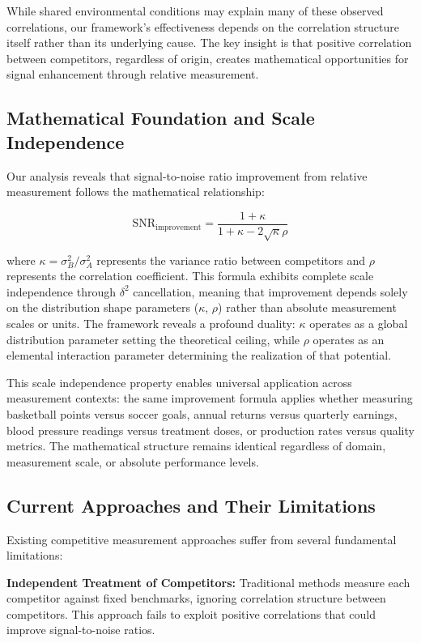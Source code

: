 While shared environmental conditions may explain many of these observed correlations, our framework's effectiveness depends on the correlation structure itself rather than its underlying cause. The key insight is that positive correlation between competitors, regardless of origin, creates mathematical opportunities for signal enhancement through relative measurement.

\subsection{Mathematical Foundation and Scale Independence}

Our analysis reveals that signal-to-noise ratio improvement from relative measurement follows the mathematical relationship:

$$\text{SNR}_{\text{improvement}} = \frac{1 + \kappa}{1 + \kappa - 2\sqrt{\kappa}\rho}$$

where $\kappa = \sigma^2_B/\sigma^2_A$ represents the variance ratio between competitors and $\rho$ represents the correlation coefficient. This formula exhibits complete scale independence through $\delta^2$ cancellation, meaning that improvement depends solely on the distribution shape parameters ($\kappa$, $\rho$) rather than absolute measurement scales or units. The framework reveals a profound duality: $\kappa$ operates as a global distribution parameter setting the theoretical ceiling, while $\rho$ operates as an elemental interaction parameter determining the realization of that potential.

This scale independence property enables universal application across measurement contexts: the same improvement formula applies whether measuring basketball points versus soccer goals, annual returns versus quarterly earnings, blood pressure readings versus treatment doses, or production rates versus quality metrics. The mathematical structure remains identical regardless of domain, measurement scale, or absolute performance levels.

\subsection{Current Approaches and Their Limitations}

Existing competitive measurement approaches suffer from several fundamental limitations:

\textbf{Independent Treatment of Competitors:}
Traditional methods measure each competitor against fixed benchmarks, ignoring correlation structure between competitors. This approach fails to exploit positive correlations that could improve signal-to-noise ratios.

